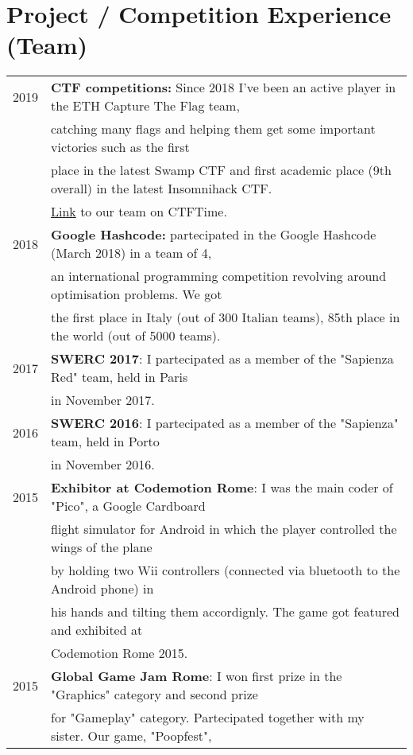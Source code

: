 \documentclass[a4paper,10pt]{article} %
\begin{document}
\section{Project / Competition Experience (Team)}
\begin{tabular}{rl}
2019 &  \textbf{CTF competitions:} Since 2018 I've been an active player in the ETH Capture The Flag team, \\
	 & catching many flags and helping them get some important victories such as the first \\
	 & place in the latest Swamp CTF and first academic place (9th overall) in the latest Insomnihack CTF.\\
	 & \href{https://ctftime.org/team/34878}{Link} to our team on CTFTime.\\
2018 &  \textbf{Google Hashcode:} partecipated in the Google Hashcode (March 2018) in a team of 4,\\
     & an international programming competition revolving around optimisation problems. We got \\
     & the first place in Italy (out of 300 Italian teams), 85th place in the world (out of 5000 teams). \\
2017 &  \textbf{SWERC 2017}: I partecipated as a member of the "Sapienza Red" team, held in Paris\\
     & in November 2017.\\
2016 &  \textbf{SWERC 2016}: I partecipated as a member of the "Sapienza" team, held in Porto\\
     & in November 2016.\\
2015 &  \textbf{Exhibitor at Codemotion Rome}: I was the main coder of "Pico", a Google Cardboard \\
     & flight simulator for Android in which the player controlled the wings of the plane \\
     & by holding two Wii controllers (connected via bluetooth to the Android phone) in \\
     & his hands and tilting them accordignly. The game got featured and exhibited at \\
     & Codemotion Rome 2015.\\
2015 &  \textbf{Global Game Jam Rome}: I won first prize in the "Graphics" category and second prize \\
     & for "Gameplay" category. Partecipated together with my sister. Our game, "Poopfest",\\

\end{tabular}
\end{document}
